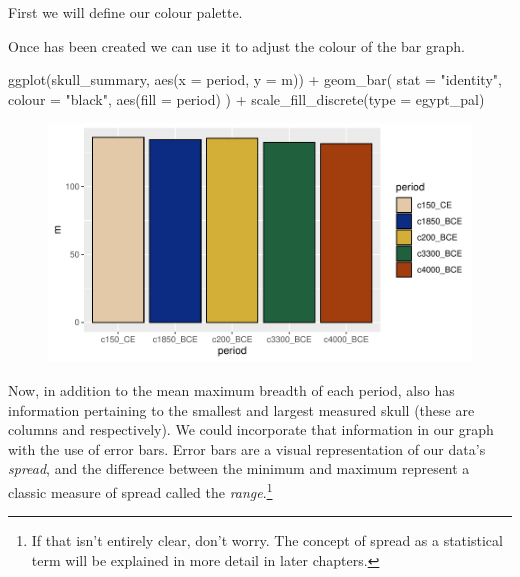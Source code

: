 

First we will define our colour palette.


\vspace{1em}

Once  has been created we can use it to adjust the colour of the bar graph.

\begin{inR}
ggplot(skull_summary, aes(x = period, y = m)) +
  geom_bar(
    stat = "identity",
    colour = "black",
    aes(fill = period)
  ) +
  scale_fill_discrete(type = egypt_pal)
\end{inR}

\vspace{2em}

\begin{figure}[H]
\includegraphics[scale = .75]{graphics/ch3Figs/bar_2.pdf}
\end{figure}

Now, in addition to the mean maximum breadth of each period,  also has information pertaining to the smallest and largest measured skull (these are columns  and  respectively). We could incorporate that information in our graph with the use of \glspl{error bar}. Error bars are a visual representation of our data's \textit{spread}, and the difference between the minimum and maximum represent a classic measure of spread called the \textit{range}.\footnote{If that isn't entirely clear, don't worry. The concept of spread as a statistical term will be explained in more detail in later chapters.}

